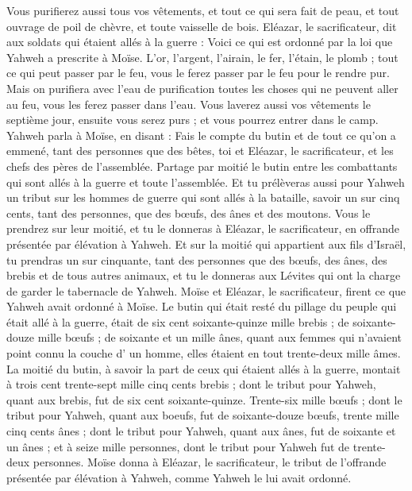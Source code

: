 \begin{multicols}{2}
Vous purifierez aussi tous vos vêtements, et tout ce qui sera fait de peau, et tout ouvrage de poil de chèvre, et toute vaisselle de bois.
Eléazar, le sacrificateur, dit aux soldats qui étaient allés à la guerre : Voici ce qui est ordonné par la loi que Yahweh a prescrite à Moïse.
L'or, l'argent, l'airain, le fer, l'étain, le plomb ;
tout ce qui peut passer par le feu, vous le ferez passer par le feu pour le rendre pur. Mais on purifiera avec l'eau de purification toutes les choses qui ne peuvent aller au feu, vous les ferez passer dans l’eau.
Vous laverez aussi vos vêtements le septième jour, ensuite vous serez purs ; et vous pourrez entrer dans le camp.
Yahweh parla à Moïse, en disant :
Fais le compte du butin et de tout ce qu'on a emmené, tant des personnes que des bêtes, toi et Eléazar, le sacrificateur, et les chefs des pères de l'assemblée.
Partage par moitié le butin entre les combattants qui sont allés à la guerre et toute l'assemblée.
Et tu prélèveras aussi pour Yahweh un tribut sur les hommes de guerre qui sont allés à la bataille, savoir un sur cinq cents, tant des personnes, que des bœufs, des ânes et des moutons.
Vous le prendrez sur leur moitié, et tu le donneras à Eléazar, le sacrificateur, en offrande présentée par élévation à Yahweh.
Et sur la moitié qui appartient aux fils d'Israël, tu prendras un sur cinquante, tant des personnes que des bœufs, des ânes, des brebis et de tous autres animaux, et tu le donneras aux Lévites qui ont la charge de garder le tabernacle de Yahweh.
Moïse et Eléazar, le sacrificateur, firent ce que Yahweh avait ordonné à Moïse.
Le butin qui était resté du pillage du peuple qui était allé à la guerre, était de six cent soixante-quinze mille brebis ;
de soixante-douze mille bœufs ;
de soixante et un mille ânes,
quant aux femmes qui n'avaient point connu la couche d' un homme, elles étaient en tout trente-deux mille âmes.
La moitié du butin, à savoir la part de ceux qui étaient allés à la guerre, montait à trois cent trente-sept mille cinq cents brebis ;
dont le tribut pour Yahweh, quant aux brebis, fut de six cent soixante-quinze.
Trente-six mille bœufs ; dont le tribut pour Yahweh, quant aux boeufs, fut de soixante-douze bœufs,
trente mille cinq cents ânes ; dont le tribut pour Yahweh, quant aux ânes, fut de soixante et un ânes ;
et à seize mille personnes, dont le tribut pour Yahweh fut de trente-deux personnes.
Moïse donna à Eléazar, le sacrificateur, le tribut de l'offrande présentée par élévation à Yahweh, comme Yahweh le lui avait ordonné.

\end{multicols}
